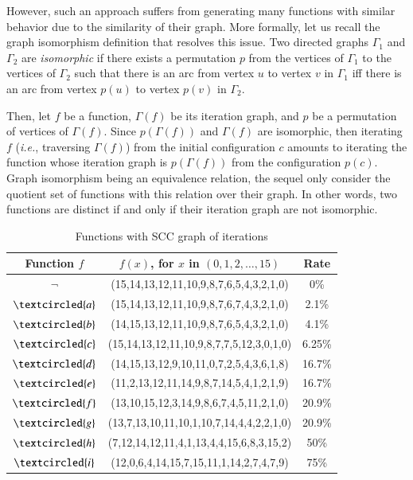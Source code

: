 However, such an approach suffers from generating many functions with similar
behavior due to the similarity of their graph.    More formally, let us recall
the graph isomorphism definition that resolves this issue. 
Two directed graphs $\Gamma_1$ and $\Gamma_2$
 are \emph{isomorphic} 
if there exists a permutation $p$ from the vertices of
$\Gamma_1$ to the vertices of $\Gamma_2$ such that
there is an arc from vertex $u$ to vertex  $v$  in $\Gamma_1$ 
iff there is an arc from vertex $p(u)$ to vertex  $p(v)$  in 
$\Gamma_2$.


Then, let $f$ be a function, $\Gamma(f)$ 
be its iteration graph, and $p$ 
be a permutation of vertices of $\Gamma(f)$. 
Since $p(\Gamma(f))$ and $\Gamma(f)$ are isomorphic,   
then iterating  $f$ 
(\textit{i.e.}, traversing $\Gamma(f)$) from the initial configuration $c$
amounts to iterating the function whose iteration graph is $p(\Gamma(f))$
from the configuration $p(c)$.
Graph isomorphism being an equivalence relation, the sequel only 
consider the quotient set of functions with this relation over their graph.
In other words, two functions are distinct if and only if their iteration
graph are not isomorphic.



\begin{table}
\centering
\begin{tabular}{|c|c|c|}
\hline
Function $f$ & $f(x)$, for $x$ in $(0,1,2,\hdots,15)$ & Rate\\ 
\hline
$\neg$&(15,14,13,12,11,10,9,8,7,6,5,4,3,2,1,0)&0\%\\
\hline
$\textcircled{a}$&(15,14,13,12,11,10,9,8,7,6,7,4,3,2,1,0)&2.1\%\\
\hline
$\textcircled{b}$&(14,15,13,12,11,10,9,8,7,6,5,4,3,2,1,0)&4.1\%\\
\hline
$\textcircled{c}$&(15,14,13,12,11,10,9,8,7,7,5,12,3,0,1,0)&6.25\%\\
\hline
$\textcircled{d}$&(14,15,13,12,9,10,11,0,7,2,5,4,3,6,1,8)&16.7\%\\
\hline
$\textcircled{e}$&(11,2,13,12,11,14,9,8,7,14,5,4,1,2,1,9)&16.7\%\\
\hline
$\textcircled{f}$&(13,10,15,12,3,14,9,8,6,7,4,5,11,2,1,0)&20.9\%\\
\hline
$\textcircled{g}$&(13,7,13,10,11,10,1,10,7,14,4,4,2,2,1,0)&20.9\%\\
\hline
$\textcircled{h}$&(7,12,14,12,11,4,1,13,4,4,15,6,8,3,15,2)&50\%\\
\hline
$\textcircled{i}$&(12,0,6,4,14,15,7,15,11,1,14,2,7,4,7,9)&75\%\\
\hline
\end{tabular}
\caption{Functions with SCC graph of iterations\label{table:nc}}
\end{table}

